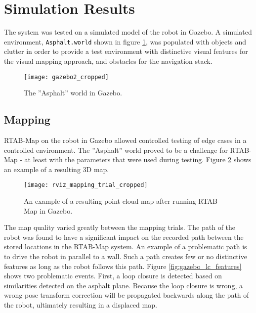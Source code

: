 \section{Simulation Results}

The system was tested on a simulated model of the robot in Gazebo. A simulated environment, \texttt{Asphalt.world} shown in figure \ref{fig:gazebo2_cropped}, was populated with objects and clutter in order to provide a test environment with distinctive visual features for the visual mapping approach, and obstacles for the navigation stack. 

\begin{figure}[h]
	\centering
	\texttt{[image: gazebo2\_cropped]}
	\caption{The ''Asphalt'' world in Gazebo. }
	\label{fig:gazebo2_cropped}
\end{figure}

\subsection{Mapping}

\ac{RTAB-Map} on the robot in Gazebo allowed controlled testing of edge cases in a controlled environment. The ''Asphalt'' world proved to be a challenge for \ac{RTAB-Map} - at least with the parameters that were used during testing. Figure \ref{fig:rviz_mapping_trial} shows an example of a resulting 3D map. 

\begin{figure}[H]
	\centering
	\texttt{[image: rviz\_mapping\_trial\_cropped]}
	\caption{An example of a resulting point cloud map after running \ac{RTAB-Map} in Gazebo. }
	\label{fig:rviz_mapping_trial}
\end{figure}

The map quality varied greatly between the mapping trials. The path of the robot was found to have a significant impact on the recorded path between the stored locations in the \ac{RTAB-Map} system. An example of a problematic path is to drive the robot in parallel to a wall. Such a path creates few or no distinctive features as long as the robot follows this path. Figure \ref{fig:gazebo_lc_features} shows two problematic events. First, a loop closure is detected based on similarities detected on the asphalt plane. Because the loop closure is wrong, a wrong pose transform correction will be propagated backwards along the path of the robot, ultimately resulting in a displaced map.

